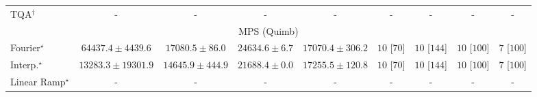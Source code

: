 \begin{tabular}{l|cccc|cccc|}
TQA$^\dagger$ & {\cellcolor[HTML]{000000}} \color[HTML]{F1F1F1} {\cellcolor{white}} \color{black} - & {\cellcolor[HTML]{000000}} \color[HTML]{F1F1F1} {\cellcolor{white}} \color{black} - & {\cellcolor[HTML]{000000}} \color[HTML]{F1F1F1} {\cellcolor{white}} \color{black} - & {\cellcolor[HTML]{000000}} \color[HTML]{F1F1F1} {\cellcolor{white}} \color{black} - & {\cellcolor[HTML]{000000}} \color[HTML]{F1F1F1} {\cellcolor{white}} \color{black} - & {\cellcolor[HTML]{000000}} \color[HTML]{F1F1F1} {\cellcolor{white}} \color{black} - & {\cellcolor[HTML]{000000}} \color[HTML]{F1F1F1} {\cellcolor{white}} \color{black} - & {\cellcolor[HTML]{000000}} \color[HTML]{F1F1F1} {\cellcolor{white}} \color{black} - \\
\cline{1-9}
\multicolumn{9}{c}{\rule{0pt}{8pt}MPS (Quimb)} \\
\midrule
Fourier$^\star$ & {\cellcolor[HTML]{C44802}} \color[HTML]{F1F1F1} $64437.4\pm 4439.6$ & {\cellcolor[HTML]{FFFBD3}} \color[HTML]{000000} $17080.5\pm 86.0$ & {\cellcolor[HTML]{FFF0AD}} \color[HTML]{000000} $24634.6\pm 6.7$ & {\cellcolor[HTML]{FFFBD3}} \color[HTML]{000000} $17070.4\pm 306.2$ & {\cellcolor[HTML]{49006A}} \color[HTML]{F1F1F1} $10$ [$70$] & {\cellcolor[HTML]{49006A}} \color[HTML]{F1F1F1} $10$ [$144$] & {\cellcolor[HTML]{49006A}} \color[HTML]{F1F1F1} $10$ [$100$] & {\cellcolor[HTML]{CD238F}} \color[HTML]{F1F1F1} $7$ [$100$] \\
Interp.$^\star$ & {\cellcolor[HTML]{FFFFE5}} \color[HTML]{000000} $13283.3\pm 19301.9$ & {\cellcolor[HTML]{FFFEDF}} \color[HTML]{000000} $14645.9\pm 444.9$ & {\cellcolor[HTML]{FFF7BC}} \color[HTML]{000000} $21688.4\pm 0.0$ & {\cellcolor[HTML]{FFFBD2}} \color[HTML]{000000} $17255.5\pm 120.8$ & {\cellcolor[HTML]{49006A}} \color[HTML]{F1F1F1} $10$ [$70$] & {\cellcolor[HTML]{49006A}} \color[HTML]{F1F1F1} $10$ [$144$] & {\cellcolor[HTML]{49006A}} \color[HTML]{F1F1F1} $10$ [$100$] & {\cellcolor[HTML]{CD238F}} \color[HTML]{F1F1F1} $7$ [$100$] \\
Linear Ramp$^\star$ & {\cellcolor[HTML]{000000}} \color[HTML]{F1F1F1} {\cellcolor{white}} \color{black} - & {\cellcolor[HTML]{000000}} \color[HTML]{F1F1F1} {\cellcolor{white}} \color{black} - & {\cellcolor[HTML]{000000}} \color[HTML]{F1F1F1} {\cellcolor{white}} \color{black} - & {\cellcolor[HTML]{000000}} \color[HTML]{F1F1F1} {\cellcolor{white}} \color{black} - & {\cellcolor[HTML]{000000}} \color[HTML]{F1F1F1} {\cellcolor{white}} \color{black} - & {\cellcolor[HTML]{000000}} \color[HTML]{F1F1F1} {\cellcolor{white}} \color{black} - & {\cellcolor[HTML]{000000}} \color[HTML]{F1F1F1} {\cellcolor{white}} \color{black} - & {\cellcolor[HTML]{000000}} \color[HTML]{F1F1F1} {\cellcolor{white}} \color{black} - \\

\end{tabular}
